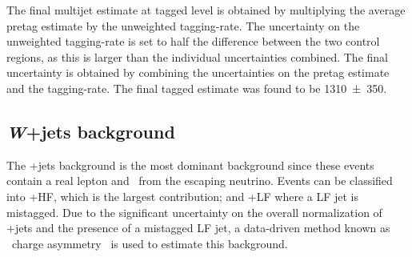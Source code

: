 The final multijet estimate at tagged level is obtained by multiplying the average pretag estimate by the unweighted tagging-rate. The uncertainty on the unweighted tagging-rate is set to half the difference between the two control regions, as this is larger than the individual uncertainties combined. The final uncertainty is obtained by combining the uncertainties on the pretag estimate and the tagging-rate. The final tagged estimate was found to be \num{1310(350)}.

\subsection{\emph{W}+jets background}

The \W+jets background is the most dominant background since these events contain a real lepton and \met\ from the escaping neutrino. Events can be classified into \W+HF, which is the largest contribution; and \W+LF where a LF jet is mistagged. Due to the significant uncertainty on the overall normalization of \W+jets and the presence of a mistagged LF jet, a data-driven method known as \W\ charge asymmetry~\cite{Measurement} is used to estimate this background.


